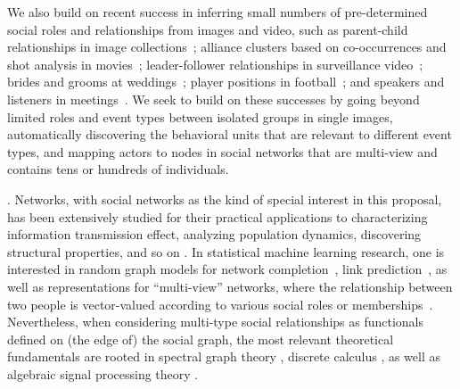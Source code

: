 We also build on recent success in inferring small numbers of pre-determined social roles and relationships from images and video, such as parent-child relationships in image collections~\cite{Gallagher,Wang2010,Murillo2012}; alliance clusters based on co-occurrences and shot analysis in movies~\cite{Ding2010,Ding2011}; leader-follower relationships in surveillance video~\cite{Yu2009,Zhang2011}; brides and grooms at weddings~\cite{FeiFeiRole2013}; player positions in football~\cite{LanSM12}; and speakers and listeners in meetings~\cite{meetingrolerecognition}. We seek to build on these successes by going beyond limited roles and event types between isolated groups in single images, automatically discovering the behavioral units that are relevant to different event types, and mapping actors to nodes in social networks that are multi-view and contains tens or hundreds of individuals.


. Networks, with social networks as the kind of special interest in this proposal, has been extensively studied for their practical applications to characterizing information transmission effect, analyzing population dynamics, discovering structural properties, and so on \cite{Jackson:2008,David:2010}. In statistical machine learning research, one is interested in random graph models for network completion~\cite{Clauset,Guimera,HannekeX09,KimL11}, link prediction~\cite{Goldberg,Liben-Nowell,TaskarWAK03}, as well as representations for ``multi-view'' networks, where the relationship between two people is vector-valued according to various social roles or memberships~\cite{AiroldiBFX08,Kim12}. Nevertheless, when considering multi-type social relationships as functionals defined on (the edge of) the social graph, the most relevant theoretical fundamentals are rooted in spectral graph theory \cite{SpectralChung}, discrete calculus \cite{Grady10}, as well as algebraic signal processing theory \cite{ASP}.

